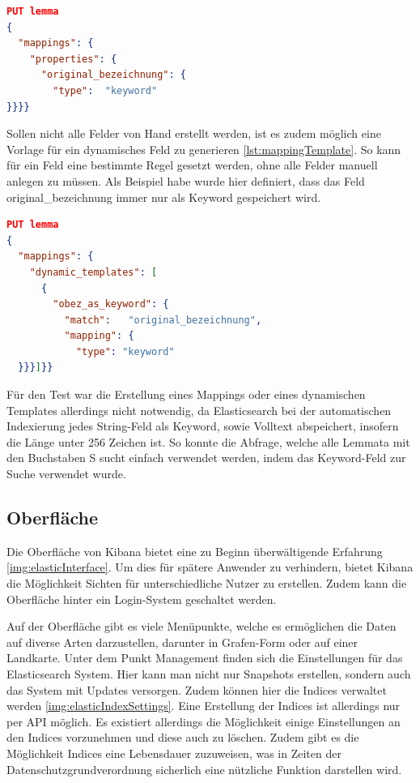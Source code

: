\begin{lstlisting}[language=JSON, frame=single, label={lst:mapping}] 
PUT lemma
{
  "mappings": {
    "properties": {
      "original_bezeichnung": {
        "type":  "keyword"
}}}}
\end{lstlisting}

Sollen nicht alle Felder von Hand erstellt werden, ist es zudem möglich eine Vorlage für ein dynamisches Feld zu generieren \ref{lst:mappingTemplate}. So kann für ein Feld eine bestimmte Regel gesetzt werden, ohne alle Felder manuell anlegen zu müssen. Als Beispiel habe wurde hier definiert, dass das Feld original\_bezeichnung immer nur als Keyword gespeichert wird.

\begin{lstlisting}[language=JSON, frame=single, label={lst:mappingTemplate}] 
PUT lemma
{
  "mappings": {
    "dynamic_templates": [
      {
        "obez_as_keyword": {
          "match":   "original_bezeichnung",
          "mapping": {
            "type": "keyword"
  }}}]}}
\end{lstlisting}

Für den Test war die Erstellung eines Mappings oder eines dynamischen Templates allerdings nicht notwendig, da Elasticsearch bei der automatischen Indexierung jedes String-Feld als Keyword, sowie Volltext abspeichert, insofern die Länge unter 256 Zeichen ist. So konnte die Abfrage, welche alle Lemmata mit den Buchstaben S sucht einfach verwendet werden, indem das Keyword-Feld zur Suche verwendet wurde.

\subsection{Oberfläche}

Die Oberfläche von Kibana bietet eine zu Beginn überwältigende Erfahrung \ref{img:elasticInterface}. Um dies für spätere Anwender zu verhindern, bietet Kibana die Möglichkeit Sichten für unterschiedliche Nutzer zu erstellen. Zudem kann die Oberfläche hinter ein Login-System geschaltet werden.

Auf der Oberfläche gibt es viele Menüpunkte, welche es ermöglichen die Daten auf diverse Arten darzustellen, darunter in Grafen-Form oder auf einer Landkarte. Unter dem Punkt Management finden sich die Einstellungen für das Elasticsearch System. Hier kann man nicht nur Snapshots erstellen, sondern auch das System mit Updates versorgen. Zudem können hier die Indices verwaltet werden \ref{img:elasticIndexSettings}. Eine Erstellung der Indices ist allerdings nur per API möglich. Es existiert allerdings die Möglichkeit einige Einstellungen an den Indices vorzunehmen und diese auch zu löschen. Zudem gibt es die Möglichkeit Indices eine Lebensdauer zuzuweisen, was in Zeiten der Datenschutzgrundverordnung sicherlich eine nützliche Funktion darstellen wird. 

